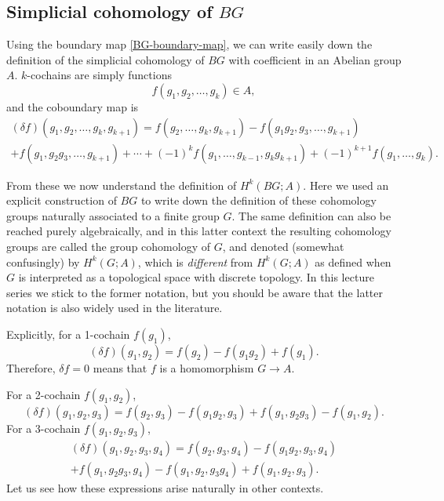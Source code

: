 \documentclass[12pt]{article}
\numberwithin{equation}{section}
\numberwithin{figure}{section}
\theoremstyle{remark}
\begin{document}
\subsection{Simplicial cohomology of $BG$}

Using the boundary map \eqref{BG-boundary-map}, we can write easily down
the definition of the simplicial cohomology of $BG$ 
with coefficient in an Abelian group $A$.
$k$-cochains are simply functions \begin{equation}
f(g_1,g_2,\ldots,g_k)\in A,
\end{equation} and the coboundary map is \begin{multline}
(\delta f)(g_1,g_2,\ldots,g_k,g_{k+1}) = 
f(g_2,\ldots,g_k,g_{k+1}) - f(g_1g_2,g_3,\ldots,g_{k+1})  \\
+ f(g_1,g_2g_3,\ldots,g_{k+1}) +\cdots + 
(-1)^{k}f(g_1,\ldots,g_{k-1},g_{k}g_{k+1})
+ (-1)^{k+1} f(g_1,\ldots,g_k).
\end{multline}

From these we now understand the definition of $H^k(BG;A)$.
Here we used an explicit construction of $BG$ to write down
the definition of these cohomology groups naturally associated 
to a finite group $G$.
The same definition can also be reached purely algebraically,
and in this latter context the resulting cohomology groups are 
called the group cohomology of $G$, and denoted (somewhat confusingly)
by $H^k(G;A)$, which is \emph{different} from $H^k(G;A)$
as defined when $G$ is interpreted as a topological space 
with discrete topology.
In this lecture series we stick to the former notation,
but you should be aware that the latter notation is 
also widely used in the literature.

Explicitly, for a 1-cochain $f(g_1)$, \begin{equation}
(\delta f)(g_1,g_2)=f(g_2)-f(g_1g_2)+f(g_1).
\label{delta-1}
\end{equation} 
Therefore, $\delta f=0$ means that $f$ is a homomorphism $G\to A$.

For a 2-cochain $f(g_1,g_2)$, \begin{equation}
(\delta f)(g_1,g_2,g_3)=f(g_2,g_3)-f(g_1g_2,g_3)+f(g_1,g_2g_3)-f(g_1,g_2).
\label{delta-2}
\end{equation} 
For a 3-cochain $f(g_1,g_2,g_3)$, \begin{multline}
(\delta f)(g_1,g_2,g_3,g_4)=f(g_2,g_3,g_4)-f(g_1g_2,g_3,g_4)\\
+f(g_1,g_2g_3,g_4)-f(g_1,g_2,g_3g_4)+f(g_1,g_2,g_3).
\label{delta-3}
\end{multline}
Let us see how these expressions arise naturally in other contexts.
\end{document}

